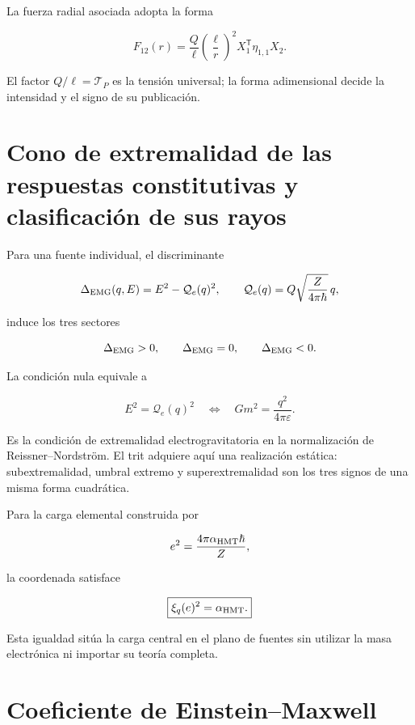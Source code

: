La fuerza radial asociada adopta la forma

\begin{equation}
F_{12}(r)=\frac{Q}{\ell}
\left(\frac{\ell}{r}\right)^2
X_1^{\mathsf T}\eta_{1,1}X_2.
\label{eq:rm-emg-force}
\end{equation}

El factor \(Q/\ell=\mathscr T_P\) es la tensi\'on universal; la forma
adimensional decide la intensidad y el signo de su publicaci\'on.

\section{Cono de extremalidad de las respuestas constitutivas y clasificación de sus rayos}

Para una fuente individual, el discriminante

\[
\Delta_{\rm EMG}(q,E)=E^2-\mathcal Q_e(q)^2,
\qquad
\mathcal Q_e(q)=Q\sqrt{\frac{Z}{4\pi\hbar}}\,q,
\]

induce los tres sectores

\[
\Delta_{\rm EMG}>0,
\qquad
\Delta_{\rm EMG}=0,
\qquad
\Delta_{\rm EMG}<0.
\]

La condici\'on nula equivale a

\begin{equation}
E^2=\mathcal Q_e(q)^2
\quad\Longleftrightarrow\quad
Gm^2=\frac{q^2}{4\pi\varepsilon}.
\label{eq:rm-rn-extremality}
\end{equation}

Es la condici\'on de extremalidad electrogravitatoria en la normalizaci\'on de
Reissner--Nordstr\"om. El trit adquiere aqu\'i una realizaci\'on est\'atica:
subextremalidad, umbral extremo y superextremalidad son los tres signos de una
misma forma cuadr\'atica.

Para la carga elemental construida por

\[
e^2=\frac{4\pi\alpha_{\rm HMT}\hbar}{Z},
\]

la coordenada satisface

\begin{equation}
\boxed{\xi_q(e)^2=\alpha_{\rm HMT}.}
\label{eq:rm-electron-electric-coordinate}
\end{equation}

Esta igualdad sit\'ua la carga central en el plano de fuentes sin utilizar la
masa electr\'onica ni importar su teor\'ia completa.

\section{Coeficiente de Einstein--Maxwell}

